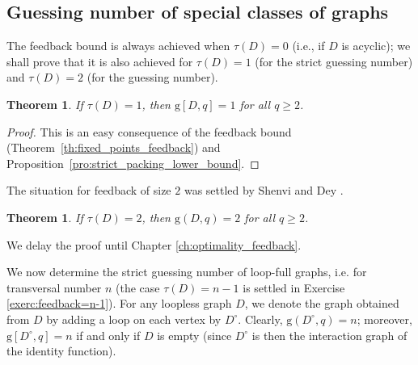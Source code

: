 \documentclass[a4paper, 11pt]{book}
\numberwithin{equation}{section}
\theoremstyle{plain}
\newtheorem{theorem}	[equation]	{Theorem}
\newcommand{\loopfull}[1]{{#1^\circ}}
\newcommand{\feedback}{\tau}
\newcommand{\guessing}{\mathrm{g}}
\renewcommand{\(}{\ldbrack}
\renewcommand{\)}{\rdbrack}
\begin{document}
\subsection{Guessing number of special classes of graphs}




The feedback bound is always achieved when $\feedback(D) = 0$ (i.e., if $D$ is acyclic); we shall prove that it is also achieved for $\feedback(D) = 1$ (for the strict guessing number) and $\feedback(D) = 2$ (for the guessing number).


\begin{theorem} \label{cor:feedback=1}
If $\feedback(D) = 1$, then $\guessing[D,q] = 1$ for all $q \ge 2$.
\end{theorem}

\begin{proof}
This is an easy consequence of the feedback bound (Theorem~\ref{th:fixed_points_feedback}) and Proposition~\ref{pro:strict_packing_lower_bound}.
\end{proof}



The situation for feedback of size $2$ was settled by Shenvi and Dey \cite{SD10}.


\begin{theorem} \label{th:guessing_number_feedback2}
If $\feedback(D) = 2$, then $\guessing(D,q) = 2$ for all $q \ge 2$.
\end{theorem}

We delay the proof until Chapter \ref{ch:optimality_feedback}.



We now determine the strict guessing number of loop-full graphs, i.e. for transversal number $n$ (the case $\feedback(D) = n-1$ is settled in Exercise \ref{exerc:feedback=n-1}). For any loopless graph $D$, we denote the graph obtained from $D$ by adding a loop on each vertex by $\loopfull{D}$. Clearly, $\guessing(\loopfull{D}, q) = n$; moreover, $\guessing[\loopfull{D}, q] = n$ if and only if $D$ is empty (since $\loopfull{D}$ is then the interaction graph of the identity function).
\end{document}
